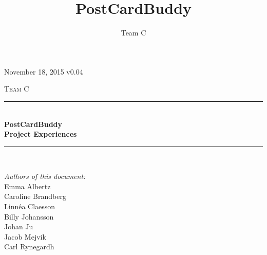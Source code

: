 \documentclass[10pt,a4paper]{article}
\title{PostCardBuddy}
\author{Team C}
\begin{document}
\begin{titlepage}
\newcommand{\HRule}{\rule{\linewidth}{0.5mm}}


\begin{flushright}
November 18, 2015 v0.04\\[3cm]
\end{flushright}


\centering
\textsc{\LARGE Team C}\\[0.5cm]

\HRule \\[0.4cm]
{ \huge \bfseries PostCardBuddy}\\[0.3cm]
{\Large \bfseries Project Experiences}\\[0.4cm] %
\HRule \\[1.5cm]

\vfill
\begin{flushleft}
\textit{Authors of this document:}\\
Emma Albertz\\
Caroline Brandberg\\
Linnéa Claesson\\
Billy Johansson\\
Johan Ju\\
Jacob Mejvik\\
Carl Rynegardh
\end{flushleft}

\end{titlepage}



%



\setcounter{tocdepth}{2}
\tableofcontents
\newpage
{}

\end{document}
